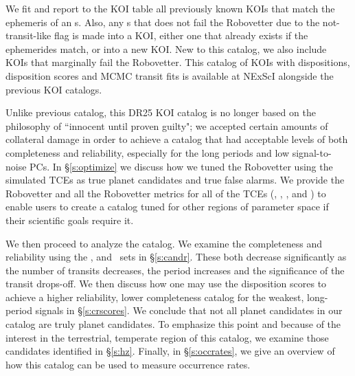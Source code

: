 We fit and report to the KOI table all previously known KOIs that match the ephemeris of an \opstce s. Also, any \opstce s that does not fail the Robovetter due to the not-transit-like flag is made into a KOI, either one that already exists if the ephemerides match, or into a new KOI. New to this catalog, we also include KOIs that marginally fail the Robovetter.   This catalog of KOIs with dispositions, disposition scores and MCMC transit fits is available at NExScI alongside the previous KOI catalogs.

Unlike previous catalog, this DR25 KOI catalog is no longer based on the philosophy of ``innocent until proven guilty"; we accepted certain amounts of collateral damage in order to achieve a catalog that had acceptable levels of both completeness and reliability, especially for the long periods and low signal-to-noise PCs. In \S\ref{s:optimize} we discuss how we tuned the Robovetter using the simulated TCEs as true planet candidates and true false alarms. We provide the Robovetter and all the Robovetter metrics for all of the TCEs (\opstce, \injtce, \invtce, and \scrtce) to enable users to create a catalog tuned for other regions of parameter space if their scientific goals require it. 

We then proceed to analyze the catalog.  We examine the completeness and reliability using the \injtce, \invtce and \scrtce\ sets in \S\ref{s:candr}. These both decrease significantly as the number of transits decreases, the period increases and the significance of the transit drops-off.  We then discuss how one may use the disposition scores to achieve a higher reliability, lower completeness catalog for the weakest, long-period signals in \S\ref{s:crscores}.  We conclude that not all planet candidates in our catalog are truly planet candidates. To emphasize this point and because of the interest in the terrestrial, temperate region of this catalog, we examine those candidates identified in \S\ref{s:hz}. Finally, in \S\ref{s:occrates}, we give an overview of how this catalog can be used to measure occurrence rates.




